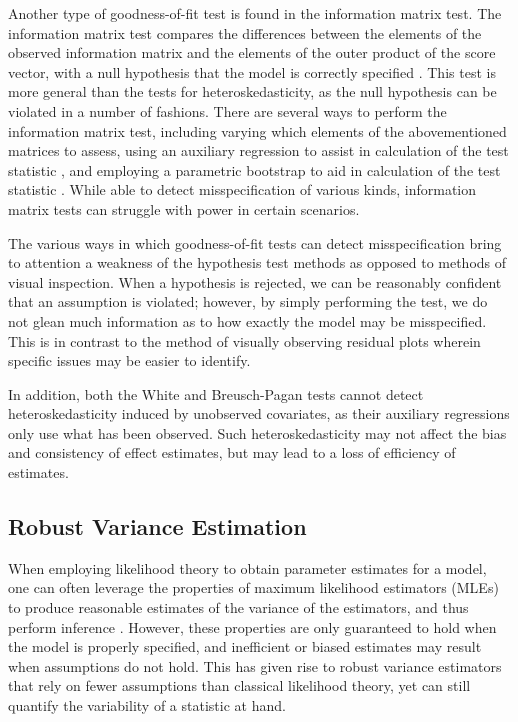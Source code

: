 \documentclass[submit]{smj}
\begin{document}
		Another type of goodness-of-fit test is found in the information matrix test. The information matrix test compares the differences between the elements of the observed information matrix and the elements
		of the outer product of the score vector, with a null hypothesis that the model is correctly specified \citep{White1982}. This test is more general than the tests for heteroskedasticity, as the null
		hypothesis can be violated in a number of fashions. There are several ways to perform the information matrix test, including varying which elements of the abovementioned matrices to assess, using an 
		auxiliary regression to assist in calculation of the test statistic \citep{Chesher}, and employing a parametric bootstrap to aid in calculation of the test statistic \citep{Dhaene}. While able to
		detect misspecification of various kinds, information matrix tests can struggle with power in certain scenarios.

		The various ways in which goodness-of-fit tests can detect misspecification bring to attention a weakness of the hypothesis test methods as opposed to methods of visual inspection.
		When a hypothesis is rejected, we can be reasonably confident that an assumption is violated; however, by simply performing the test, we do not glean much information as to how exactly the
		model may be misspecified. This is in contrast to the method of visually observing residual plots wherein specific issues may be easier to identify.

		In addition, both the White and Breusch-Pagan tests cannot detect heteroskedasticity induced by unobserved covariates, as their auxiliary regressions only use what has been observed. Such heteroskedasticity
		may not affect the bias and consistency of effect estimates, but may lead to a loss of efficiency of estimates. 

	\subsection*{Robust Variance Estimation}

		When employing likelihood theory to obtain parameter estimates for a model, one can often leverage the properties of maximum likelihood estimators (MLEs) to produce reasonable estimates of the variance of the
		estimators, and thus perform inference \citep{Millar}. However, these properties are only guaranteed to hold when the model is properly specified, and inefficient or biased estimates may result when assumptions
		do not hold. This has given rise to robust variance estimators that rely on fewer assumptions than classical likelihood theory, yet can still quantify the variability of a statistic
		at hand.
\end{document}
